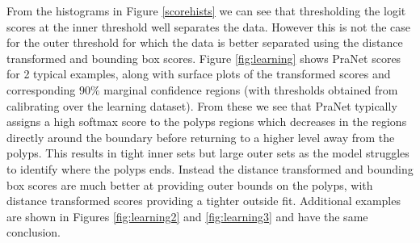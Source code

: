From the histograms in Figure \ref{scorehists} we can see that thresholding the logit scores at the inner threshold well separates the data. However this is not the case for the outer threshold for which the data is better separated using the distance transformed and bounding box scores. Figure \ref{fig:learning} shows PraNet scores for 2 typical examples, along with surface plots of the transformed scores and corresponding $90\%$ marginal confidence regions (with thresholds obtained from calibrating over the learning dataset). From these we see that PraNet typically assigns a high softmax score to the polyps regions which decreases in the regions directly around the  boundary before returning to a higher level away from the polyps. This results in tight inner sets but large outer sets as the model struggles to identify where the polyps ends. Instead the distance transformed and bounding box scores are much better at providing outer bounds on the polyps, with distance transformed scores providing a tighter outside fit. Additional examples are shown in Figures \ref{fig:learning2} and \ref{fig:learning3} and have the same conclusion.


